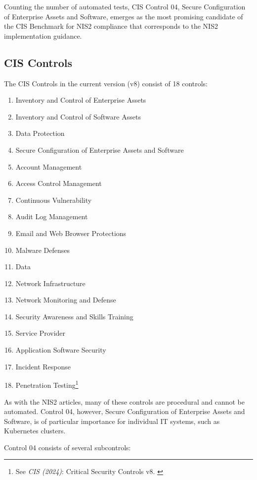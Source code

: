 Counting the number of automated tests, CIS Control 04, Secure Configuration of Enterprise Assets and Software, emerges as the most promising candidate of the CIS Benchmark for NIS2 compliance that corresponds to the NIS2 implementation guidance.

\subsection{CIS Controls}

The CIS Controls in the current version (v8) consist of 18 controls:

\begin{enumerate}
    \item Inventory and Control of Enterprise Assets
    \item Inventory and Control of Software Assets
    \item Data Protection
    \item Secure Configuration of Enterprise Assets and Software
    \item Account Management
    \item Access Control Management
    \item Continuous Vulnerability
    \item Audit Log Management
    \item Email and Web Browser Protections
    \item Malware Defenses
    \item Data
    \item Network Infrastructure
    \item Network Monitoring and Defense
    \item Security Awareness and Skills Training
    \item Service Provider
    \item Application Software Security
    \item Incident Response
    \item Penetration Testing\footnote{See \textit{CIS (2024)}: Critical Security Controls v8. \cite{cisControls}}
\end{enumerate}

As with the NIS2 articles, many of these controls are procedural and cannot be automated. Control 04, however, Secure Configuration of Enterprise Assets and Software, is of particular importance for individual IT systems, such as Kubernetes clusters.

Control 04 consists of several subcontrols:

